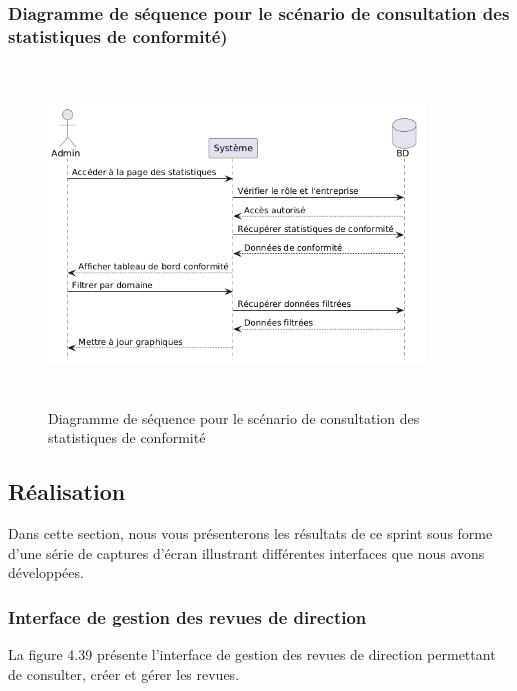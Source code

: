 \subsubsection{Diagramme de séquence pour le scénario de consultation des statistiques de conformité)}
\begin{figure}[H]
    \centering
    \includegraphics[width=10cm,height=9cm]{images/consultcompliancestatsseq.png}
    \caption{Diagramme de séquence pour le scénario de consultation des statistiques de conformité}
\end{figure}

\subsection{Réalisation}
\noindent Dans cette section, nous vous présenterons les résultats de ce sprint sous forme d'une série de captures d'écran illustrant différentes interfaces que nous avons développées.

\subsubsection{Interface de gestion des revues de direction}
\noindent La figure 4.39 présente l'interface de gestion des revues de direction permettant de consulter, créer et gérer les revues.

